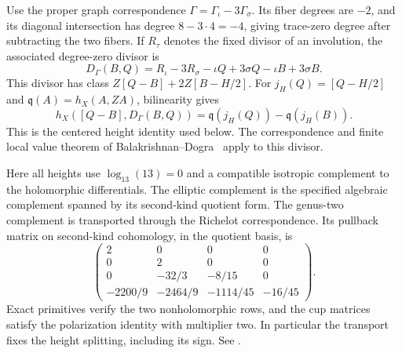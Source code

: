 Use the proper graph correspondence
$\Gamma=\Gamma_\iota-3\Gamma_\sigma$. Its fiber degrees are $-2$,
and its diagonal intersection has degree $8-3\cdot4=-4$, giving
trace-zero degree after subtracting the two fibers. If $R_\tau$ denotes
the fixed divisor of an involution, the associated degree-zero divisor is
\begin{equation}\label{eq:t10-graphdiv}
 D_\Gamma(B,Q)=R_\iota-3R_\sigma-\iota Q+3\sigma Q
                                      -\iota B+3\sigma B.
\end{equation}
This divisor has class $Z[Q-B]+2Z[B-H/2]$. For
$j_H(Q)=[Q-H/2]$ and $\mathfrak q(A)=h_X(A,ZA)$, bilinearity gives
\[
 h_X([Q-B],D_\Gamma(B,Q))
      =\mathfrak q(j_H(Q))-\mathfrak q(j_H(B)).
\]
This is the centered height identity used below. The correspondence and finite local value theorem of
Balakrishnan--Dogra~\cite[Definition~6.2 and Theorem~6.3]{BalakrishnanDogra2018}
apply to this divisor.

Here all heights use $\log_{13}(13)=0$ and a compatible isotropic
complement to the holomorphic differentials. The elliptic complement is
the specified algebraic complement spanned by its second-kind quotient
form. The genus-two complement is transported through the Richelot
correspondence. Its pullback matrix on second-kind cohomology, in the
quotient basis, is
\[
 \begin{pmatrix}
 2&0&0&0\\0&2&0&0\\0&-32/3&-8/15&0\\
 -2200/9&-2464/9&-1114/45&-16/45
 \end{pmatrix}.
\]
Exact primitives verify the two nonholomorphic rows, and the cup matrices
satisfy the polarization identity with multiplier two. In particular the
transport fixes the height splitting, including its sign.
See .

